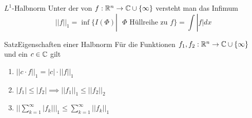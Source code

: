 \begin{Def}{$L^1$-Halbnorm}
Unter der  von $f:\mathbb{R}^n\rightarrow\mathbb{C}\cup \{\infty\}$ versteht man das Infimum
$$||f||_1=\inf\{I(\Phi) |\mbox{ $\Phi$ Hüllreihe zu $f$} \}=\int |f|dx$$
\end{Def}
\begin{Satz}{Satz}{Eigenschaften einer Halbnorm}
Für die Funktionen $f_1, f_2: \mathbb{R}^n\rightarrow \mathbb{C}\cup\{\infty\}$ und ein $c\in\mathbb{C}$ gilt
\begin{enumerate}
\item $||c\cdot f||_1 = |c|\cdot ||f||_1$
\item $|f_1| \leq |f_2|  \implies ||f_1||_1 \leq ||f_2||_2$
\item $||\sum_{k=1}^\infty |f_k| ||_1\leq \sum_{k=1}^\infty ||f_k||_1$
\end{enumerate}
\end{Satz}
\newpage
